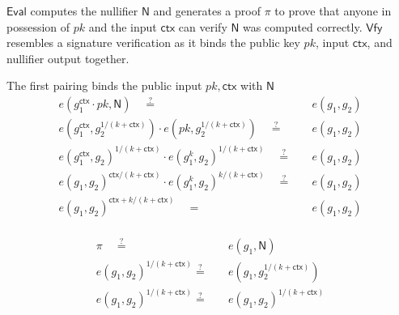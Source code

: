     

$\mathsf{Eval}$ computes the nullifier $\textsf{N}$ and generates a proof $\pi$ to prove that anyone in possession of $pk$ and the input $\textsf{ctx}$ can verify $\textsf{N}$ was computed correctly. $\mathsf{Vfy}$ resembles a signature verification as it binds  the public key $pk$, input $\textsf{ctx}$, and nullifier output together. 

The first pairing binds the public input $pk, \mathsf{ctx}$ with $\mathsf{N}$
\begin{align*}
    e(g_1^\mathsf{ctx} \cdot pk, \mathsf{N})  \quad  \stackrel{?}{=}& \quad  e(g_1, g_2) \\
    e(g_1^\mathsf{ctx}, g_2^{1/(k + \mathsf{ctx})}) \cdot  e(pk, g_2^{1/(k + \mathsf{ctx})}) \quad  \stackrel{?}{=}& \quad  e(g_1, g_2) \\
    e(g_1^\mathsf{ctx}, g_2)^{1/(k + \mathsf{ctx})} \cdot  e(g_1^k, g_2)^{1/(k + \mathsf{ctx})} \quad  \stackrel{?}{=}& \quad  e(g_1, g_2) \\
    e(g_1, g_2)^{\mathsf{ctx}/(k + \mathsf{ctx})} \cdot  e(g_1^k, g_2)^{k/(k + \mathsf{ctx})} \quad  \stackrel{?}{=}& \quad  e(g_1, g_2) \\
    e(g_1, g_2)^{\mathsf{ctx} + k/(k + \mathsf{ctx})}  \quad =& \quad e(g_1, g_2) \\
\end{align*}

\begin{align*}
     \pi  \quad  \stackrel{?}{=}& \quad e(g_1, \mathsf{N}) \\
     e(g_1, g_2)^{1/(k + \textsf{ctx})}  \stackrel{?}{=}& \quad  e(g_1, g_2^{1/(k + \mathsf{ctx})}) \\
     e(g_1, g_2)^{1/(k + \textsf{ctx})}  \stackrel{?}{=}& \quad  e(g_1, g_2)^{1/(k + \textsf{ctx})} \\
\end{align*}


